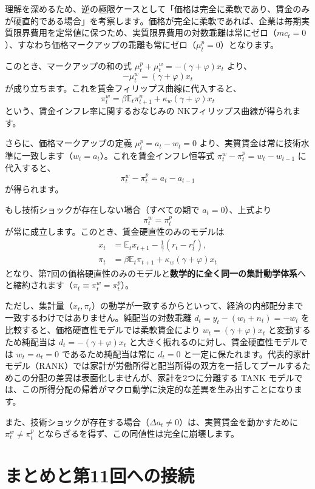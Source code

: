 \documentclass[
  japanese,
  lualatex,
  ja=standard,
  12pt,
  a4paper]{ltjsarticle}
\begin{document}
理解を深めるため、逆の極限ケースとして「価格は完全に柔軟であり、賃金のみが硬直的である場合」を考察します。価格が完全に柔軟であれば、企業は毎期実質限界費用を定常値に保つため、実質限界費用の対数乖離は常にゼロ（\(mc_t=0\)）、すなわち価格マークアップの乖離も常にゼロ（\(\mu_t^p=0\)）となります。

このとき、マークアップの和の式
\(\mu_t^p + \mu_t^w = -(\gamma+\varphi)x_t\) より、 \[
-\mu_t^w = (\gamma+\varphi)x_t
\] が成り立ちます。これを賃金フィリップス曲線に代入すると、 \[
\pi_t^w
=
\beta\mathbb{E}_t\pi_{t+1}^w
+
\kappa_w(\gamma+\varphi)x_t
\] という、賃金インフレ率に関するおなじみの
NKフィリップス曲線が得られます。

さらに、価格マークアップの定義 \(\mu_t^p = a_t - w_t = 0\)
より、実質賃金は常に技術水準に一致します（\(w_t = a_t\)）。これを賃金インフレ恒等式
\(\pi_t^w - \pi_t^p = w_t - w_{t-1}\) に代入すると、 \[
\pi_t^w - \pi_t^p = a_t - a_{t-1}
\] が得られます。

もし技術ショックが存在しない場合（すべての期で \(a_t=0\)）、上式より \[
\pi_t^w = \pi_t^p
\] が常に成立します。このとき、賃金硬直性のみのモデルは \[
\begin{aligned}
x_t
&=
\mathbb{E}_t x_{t+1}
-
\frac{1}{\gamma}(r_t-r_t^f),
\\
\pi_t
&=
\beta\mathbb{E}_t\pi_{t+1}
+
\kappa_w(\gamma+\varphi)x_t
\end{aligned}
\]
となり、第7回の価格硬直性のみのモデルと\textbf{数学的に全く同一の集計動学体系}へと縮約されます（\(\pi_t \equiv \pi_t^w = \pi_t^p\)）。

ただし、集計量（\(x_t, \pi_t\)）の動学が一致するからといって、経済の内部配分まで一致するわけではありません。純配当の対数乖離
\(d_t = y_t - (w_t + n_t) = -w_t\)
を比較すると、価格硬直性モデルでは柔軟賃金により
\(w_t = (\gamma+\varphi)x_t\) と変動するため純配当は
\(d_t = -(\gamma+\varphi)x_t\)
と大きく振れるのに対し、賃金硬直性モデルでは \(w_t=a_t=0\)
であるため純配当は常に \(d_t=0\)
と一定に保たれます。代表的家計モデル（RANK）では家計が労働所得と配当所得の双方を一括してプールするためこの分配の差異は表面化しませんが、家計を2つに分離する
TANK
モデルでは、この所得分配の帰着がマクロ動学に決定的な差異を生み出すことになります。

また、技術ショックが存在する場合（\(\Delta a_t \neq 0\)）は、実質賃金を動かすために
\(\pi_t^w \neq \pi_t^p\)
とならざるを得ず、この同値性は完全に崩壊します。

\section{まとめと第11回への接続}\label{ux307eux3068ux3081ux3068ux7b2c11ux56deux3078ux306eux63a5ux7d9a}
\end{document}
